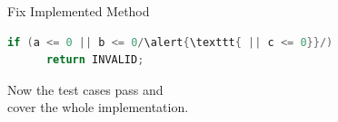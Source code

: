 \begin{Frame}[fragile]{Fix Implemented Method}
  \begin{lstlisting}[language=java,gobble=4,escapechar=/]
    if (a <= 0 || b <= 0/\alert{\texttt{ || c <= 0}}/)
      return INVALID;
  \end{lstlisting}

  \xxx

  \begin{LARGE}
    Now the test cases pass and\\
    cover the whole implementation.
  \end{LARGE}
\end{Frame}


